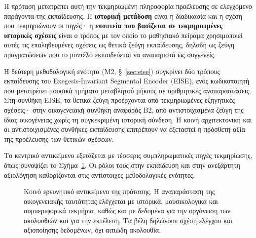\documentclass[11pt,a4paper]{article}
\begin{document}
Η πρόταση μετατρέπει αυτή την τεκμηριωμένη πληροφορία προέλευσης σε ελεγχόμενο παράγοντα της εκπαίδευσης. Η \textbf{ιστορική μετάδοση} είναι η διαδικασία και η σχέση που τεκμηριώνουν οι πηγές· η \textbf{εποπτεία που βασίζεται σε τεκμηριωμένες ιστορικές σχέσεις} είναι ο τρόπος με τον οποίο το μαθησιακό πείραμα χρησιμοποιεί αυτές τις επαληθευμένες σχέσεις ως θετικά ζεύγη εκπαίδευσης, δηλαδή ως ζεύγη πραγματώσεων που το μοντέλο εκπαιδεύεται να αναπαριστά ως συγγενείς.

Η δεύτερη μεθοδολογική ενότητα (M2, §~\ref{sec:eise}) συγκρίνει δύο τρόπους εκπαίδευσης του Exegesis-Invariant Segmental Encoder (EISE), ενός κωδικοποιητή που μετατρέπει μουσικά τμήματα μεταβλητού μήκους σε αριθμητικές αναπαραστάσεις. Στη συνθήκη EISE, τα θετικά ζεύγη προέρχονται από τεκμηριωμένες εξηγητικές σχέσεις· στην οικογενειακή συνθήκη αναφοράς B2, από αντιστοιχισμένα ζεύγη της ίδιας οικογένειας χωρίς τη συγκεκριμένη ιστορική σύνδεση. Η κοινή αρχιτεκτονική και οι αντιστοιχισμένες συνθήκες εκπαίδευσης επιτρέπουν να εξεταστεί η πρόσθετη αξία της προέλευσης των θετικών σχέσεων.

Το κεντρικό αντικείμενο εξετάζεται με τέσσερις συμπληρωματικές πηγές τεκμηρίωσης, όπως συνοψίζει το Σχήμα~\ref{fig:conceptual-v865}. Οι ρόλοι τους στην εκπαίδευση και στην ανεξάρτητη αξιολόγηση καθορίζονται στις αντίστοιχες μεθοδολογικές ενότητες.

\begin{figure}[htbp]
\centering
{}
\caption{Κοινό ερευνητικό αντικείμενο της πρότασης. Η αναπαράσταση της οικογενειακής ταυτότητας ελέγχεται με ιστορικά, μουσικολογικά και συμπεριφορικά τεκμήρια, καθώς και με δεδομένα για την οργάνωση των ακολουθιών και για την εκτέλεση. Τα βέλη δηλώνουν σχέση ελέγχου και αξιοποίησης δεδομένων, όχι αιτιώδη ακολουθία.}
\label{fig:conceptual-v865}
\end{figure}
\FloatBarrier
\end{document}
